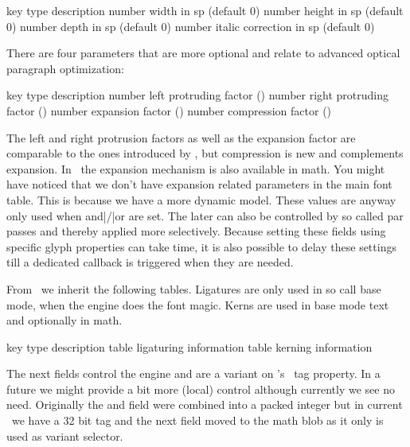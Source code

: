 \starttabulate[|l|l|pl|]
\FL
\BC key            \BC type   \BC description                         \NC \NR
\ML
\NC {}  \NC number \NC width in sp (default 0)             \NC \NR
\NC {} \NC number \NC height in sp (default 0)            \NC \NR
\NC {}  \NC number \NC depth in sp (default 0)             \NC \NR
\NC {} \NC number \NC italic correction in sp (default 0) \NC \NR
\LL
\stoptabulate

There are four parameters that are more optional and relate to advanced optical
paragraph optimization:

\starttabulate[|l|l|pl|]
\FL
\BC key                     \BC type   \BC description                               \NC \NR
\ML
\NC {}  \NC number \NC left protruding factor  (\type {\lpcode}) \NC \NR
\NC {} \NC number \NC right protruding factor (\type {\rpcode}) \NC \NR
\NC {}       \NC number \NC expansion factor        (\type {\efcode}) \NC \NR
\NC {}     \NC number \NC compression factor      (\type {\cfcode}) \NC \NR
\LL
\stoptabulate

The left and right protrusion factors as well as the expansion factor are
comparable to the ones introduced by \PDFTEX, but compression is new and
complements expansion. In \LUAMETATEX\ the expansion mechanism is also available
in math. You might have noticed that we don't have expansion related parameters
in the main font table. This is because we have a more dynamic model. These
values are anyway only used when \type {\protrudechars} and|/|or \type
{\adjustspacing} are set. The later can also be controlled by so called par
passes and thereby applied more selectively. Because setting these fields using
specific glyph properties can take time, it is also possible to delay these
settings till a dedicated callback is triggered when they are needed.

From \TEX\ we inherit the following tables. Ligatures are only used in so call
base mode, when the engine does the font magic. Kerns are used in base mode text
and optionally in math.

\starttabulate[|l|l|pl|]
\FL
\BC key               \BC type  \BC description            \NC \NR
\ML
\NC {} \NC table \NC ligaturing information \NC \NR
\NC {}     \NC table \NC kerning information    \NC \NR
\LL
\stoptabulate

The next fields control the engine and are a variant on \TEX's \TFM\ tag
property. In a future we might provide a bit more (local) control although
currently we see no need. Originally the  and  field were
combined into a packed integer but in current \LUAMETATEX\ we have a 32 bit tag
and the next field moved to the math blob as it only is used as variant selector.

